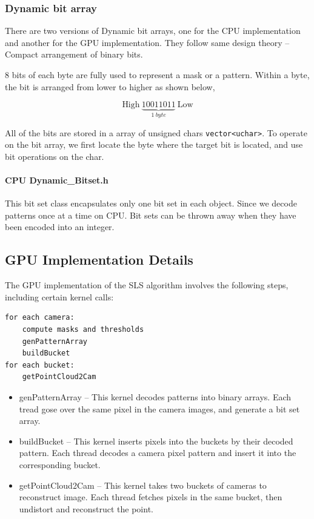 \documentclass[final,12pt,3p]{elsarticle}
\begin{document}
\subsubsection{Dynamic bit array}\label{dynamic-bit-array}

There are two versions of Dynamic bit arrays, one for the CPU implementation and another for the GPU implementation. They follow same
design theory -- Compact arrangement of binary bits.

8 bits of each byte are fully used to represent a mask or a pattern. Within a byte, the bit is arranged from lower to higher as shown below,

\[\text{High}~\underbrace{10011011}_{1~byte}~\text{Low}\]

All of the bits are stored in a array of unsigned chars
\texttt{vector\textless{}uchar\textgreater{}}. To operate on the bit
array, we first locate the byte where the target bit is located, and use bit operations on the char.

\paragraph{CPU Dynamic\_Bitset.h}\label{cpu-dynamicux5fbitset.h}

This bit set class encapsulates only one bit set in each object. Since we decode patterns once at a time on CPU. Bit sets can be thrown away when they have been encoded into an integer.

\subsection{GPU Implementation Details}\label{implementation-details-on-gpu}
The GPU implementation of the SLS algorithm involves the following steps, including certain kernel calls:

\begin{verbatim}
for each camera:
    compute masks and thresholds
    genPatternArray
    buildBucket
for each bucket:
    getPointCloud2Cam
\end{verbatim}

\begin{itemize}
\item
  genPatternArray -- This kernel decodes patterns into binary arrays.
  Each tread gose over the same pixel in the camera images, and generate a bit set array.
\item
  buildBucket -- This kernel inserts pixels into the buckets by their
  decoded pattern. Each thread decodes a camera pixel pattern and insert it into the corresponding bucket.
\item
  getPointCloud2Cam -- This kernel takes two buckets of cameras to reconstruct image. Each thread fetches pixels in the same bucket, then undistort and reconstruct the point.
\end{itemize}
\end{document}
